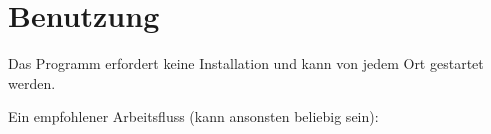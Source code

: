 \documentclass[a4paper,notitlepage,parskip=half]{scrartcl}
\begin{document}







\section{Benutzung}
Das Programm erfordert keine Installation und kann von jedem Ort gestartet werden.

Ein empfohlener Arbeitsfluss (kann ansonsten beliebig sein):
\end{document}
